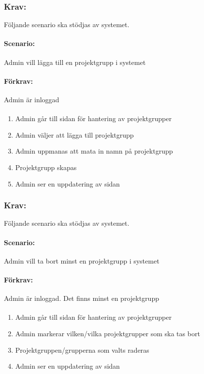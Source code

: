 \documentclass[paper=a4, fontsize=11pt,twoside]{article}
\begin{document}
	\subsubsection*{Krav:} Följande scenario ska stödjas av systemet.
	\paragraph{Scenario:}
	Admin vill lägga till en projektgrupp i systemet
	\paragraph{Förkrav:}
	Admin är inloggad
	\paragraph{}
	\begin{enumerate}
		\item Admin går till sidan för hantering av projektgrupper
		\item Admin väljer att lägga till projektgrupp
		\item Admin uppmanas att mata in namn på projektgrupp
		\item Projektgrupp skapas
		\item Admin ser en uppdatering av sidan
	\end{enumerate}
	
	\subsubsection*{Krav:} 
	Följande scenario ska stödjas av systemet.
	\paragraph{Scenario:}
	Admin vill ta bort minst en projektgrupp i systemet
	\paragraph{Förkrav:}
	Admin är inloggad. Det finns minst en projektgrupp
	\paragraph{}
	\begin{enumerate}
		\item Admin går till sidan för hantering av projektgrupper
		\item Admin markerar vilken/vilka projektgrupper som ska tas bort
		\item Projektgruppen/grupperna som valts raderas
		\item Admin ser en uppdatering av sidan
	\end{enumerate}
	
\end{document}
